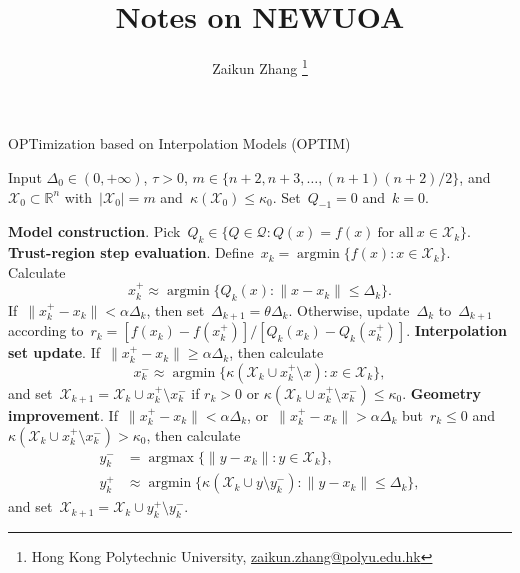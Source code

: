 \documentclass[11pt,a4paper,draft]{article}  %
\title{Notes on NEWUOA}
\date{\DTMnow}
\author{Zaikun Zhang
    \thanks{Hong Kong Polytechnic University, \url{zaikun.zhang@polyu.edu.hk}}
}
\theoremstyle{definition}
\numberwithin{equation}{section}
\DeclareMathOperator*{\argmax}{argmax}
\DeclareMathOperator*{\argmin}{argmin}
\newcommand{\RR}{\mathbb{R}}
\newcommand{\Int}{\mathcal{X}}
\newcommand{\Qua}{\mathcal{Q}}
\newcommand{\sss}[1]{{\scriptscriptstyle{#1}}}
\newcommand{\get}{{\sss{+}}}
\newcommand{\drop}{{\sss{-}}}
\begin{document}
\maketitle




\begin{algorithm}[htbp!]
    \caption{\label{alg:optim}OPTimization based on Interpolation Models (OPTIM)}
    Input $\Delta_0\in (0,+\infty)$, $\tau>0$, $m\in \{n+2, n+3, \dots, (n+1)(n+2)/2\}$,
    and~$\Int_0\subset \RR^n$ with~$|\Int_0|=m$ and~$\kappa(\Int_0) \le \kappa_0$. Set~$Q_{-1} = 0$ and~$k=0$.
    \begin{algorithmic}[1]
        \State \textbf{Model construction}.
        Pick~$Q_k \in \{Q\in\Qua\mathrel{:} Q(x)=f(x)~\text{for all}~x\in\Int_k\}$.
        \State \textbf{Trust-region step evaluation}.
        Define~$x_k = \argmin\{f(x) \mathrel{:} x\in \Int_k\}$. Calculate
        \begin{equation}
         \label{eq:xget}
          x_k^\get \approx \argmin\{Q_k(x)\mathrel{:} \|x-x_k\|\le \Delta_k\}.
        \end{equation}
        If~$\|x_k^\get-x_k\| < \alpha\Delta_k$, then set~$\Delta_{k+1} = \theta \Delta_k$.
        Otherwise,
        update~$\Delta_k$ to~$\Delta_{k+1}$ according to~$r_k = [f(x_k) - f(x_k^\get)]/[Q_k(x_k)
        - Q_k(x_k^\get)]$.
        \State \textbf{Interpolation set update}.
        If~$\|x_k^\get-x_k\| \ge \alpha\Delta_k$, then calculate
        \begin{equation}
            \label{eq:xdrop}
            x_k^\drop \approx \argmin\{\kappa(\Int_k\cup x_k^\get\setminus x) \mathrel{:} x \in
            \Int_k\},
        \end{equation}
        and set~$\Int_{k+1} = \Int_k\cup x_k^\get\setminus x_k^\drop$
        if $r_k>0$ or $\kappa(\Int_k\cup x_k^\get \setminus x_k^\drop) \le \kappa_0$.
        \State \textbf{Geometry improvement}.
        If~$\|x_k^\get-x_k\|< \alpha \Delta_k$, or~$\|x_k^\get-x_k\| > \alpha \Delta_k$
        but~$r_k\le 0$ and $\kappa(\Int_k \cup x_k^\get\setminus x_k^\drop) > \kappa_0$, then calculate
          \begin{align}
              \label{eq:ydrop}
              y_k^\drop &= \argmax\{\|y-x_k\| \mathrel{:} y \in \Int_k\}, \\
              \label{eq:yget}
              y_k^\get &\approx \argmin\{\kappa(\Int_k \cup y \setminus y_k^\drop) \mathrel{:} \|y-x_k\|\le
              \Delta_k\},
          \end{align}
       and set~$\Int_{k+1} = \Int_k\cup y_k^\get\setminus y_k^\drop$.
    \end{algorithmic}
\end{algorithm}
\end{document}

